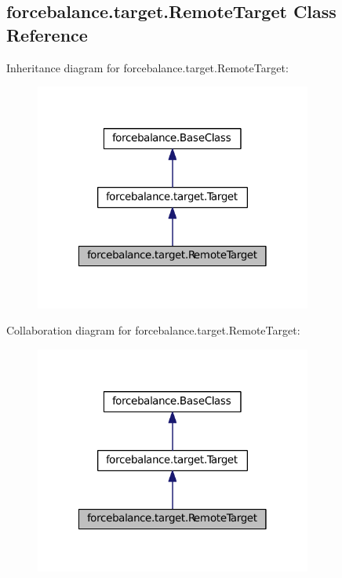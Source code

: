 \hypertarget{classforcebalance_1_1target_1_1RemoteTarget}{\subsection{forcebalance.\-target.\-Remote\-Target \-Class \-Reference}
\label{classforcebalance_1_1target_1_1RemoteTarget}
}


\-Inheritance diagram for forcebalance.\-target.\-Remote\-Target\-:
\nopagebreak
\begin{figure}[H]
\begin{center}
\leavevmode
\includegraphics[width=258pt]{classforcebalance_1_1target_1_1RemoteTarget__inherit__graph}
\end{center}
\end{figure}


\-Collaboration diagram for forcebalance.\-target.\-Remote\-Target\-:
\nopagebreak
\begin{figure}[H]
\begin{center}
\leavevmode
\includegraphics[width=258pt]{classforcebalance_1_1target_1_1RemoteTarget__coll__graph}
\end{center}
\end{figure}
